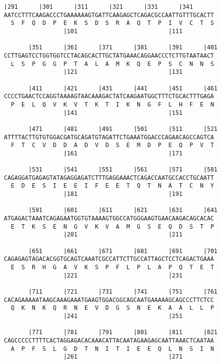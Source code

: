 \documentclass{article}
\begin{document}
\begin{Verbatim}[fontfamily=courier]
       |291      |301      |311      |321      |331      |341
AATCCTTTCAAGACCCTGAAAAAAGTGATTCAAGAGCTCAGACGCCAATTGTTTGCACTT
  S  F  Q  D  P  E  K  S  D  S  R  A  Q  T  P  I  V  C  T  S
                 |101                          |111         

       |351      |361      |371      |381      |391      |401
CCTTGAGTCCTGGTGGTCCTACAGCACTTGCTATGAAACAGGAACCCTCTTGTAATAACT
  L  S  P  G  G  P  T  A  L  A  M  K  Q  E  P  S  C  N  N  S
                 |121                          |131         

       |411      |421      |431      |441      |451      |461
CCCCTGAACTCCAGGTAAAAGTAACAAAGACTATCAAGAATGGCTTTCTGCACTTTGAGA
  P  E  L  Q  V  K  V  T  K  T  I  K  N  G  F  L  H  F  E  N
                 |141                          |151         

       |471      |481      |491      |501      |511      |521
ATTTTACTTGTGTGGACGATGCAGATGTAGATTCTGAAATGGACCCAGAACAGCCAGTCA
  F  T  C  V  D  D  A  D  V  D  S  E  M  D  P  E  Q  P  V  T
                 |161                          |171         

       |531      |541      |551      |561      |571      |581
CAGAGGATGAGAGTATAGAGGAGATCTTTGAGGAAACTCAGACCAATGCCACCTGCAATT
  E  D  E  S  I  E  E  I  F  E  E  T  Q  T  N  A  T  C  N  Y
                 |181                          |191         

       |591      |601      |611      |621      |631      |641
ATGAGACTAAATCAGAGAATGGTGTAAAAGTGGCCATGGGAAGTGAACAAGACAGCACAC
  E  T  K  S  E  N  G  V  K  V  A  M  G  S  E  Q  D  S  T  P
                 |201                          |211         

       |651      |661      |671      |681      |691      |701
CAGAGAGTAGACACGGTGCAGTCAAATCGCCATTCTTGCCATTAGCTCCTCAGACTGAAA
  E  S  R  H  G  A  V  K  S  P  F  L  P  L  A  P  Q  T  E  T
                 |221                          |231         

       |711      |721      |731      |741      |751      |761
CACAGAAAAATAAGCAAAGAAATGAAGTGGACGGCAGCAATGAAAAAGCAGCCCTTCTCC
  Q  K  N  K  Q  R  N  E  V  D  G  S  N  E  K  A  A  L  L  P
                 |241                          |251         

       |771      |781      |791      |801      |811      |821
CAGCCCCCTTTTCACTAGGAGACACAAACATTACAATAGAAGAGCAATTAAACTCAATAA
  A  P  F  S  L  G  D  T  N  I  T  I  E  E  Q  L  N  S  I  N
                 |261                          |271         

\end{Verbatim}
\end{document}
